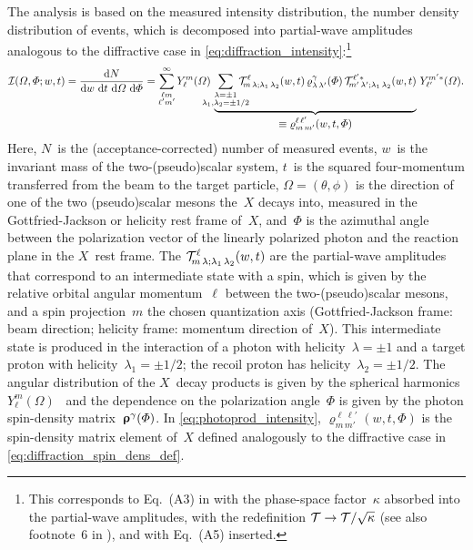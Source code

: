 The analysis is based on the measured intensity distribution, \ie the
number density distribution of events, which is decomposed into
partial-wave amplitudes analogous to the diffractive case in
\cref{eq:diffraction_intensity}:\footnote{\label{fn:photoprod_ampl_redef}This
corresponds to Eq.~(A3) in  with the
phase-space factor~$\kappa$ absorbed into the partial-wave amplitudes,
\ie with the redefinition $\mathcal{T} \to \mathcal{T} / \sqrt{\kappa}$ (see
also footnote~6 in ), and with Eq.~(A5)
inserted.}
\begin{equation}
  \label{eq:photoprod_intensity}
  \intensity(\Omega, \Phi; w, t)
  = \frac{\dif{N}}{\dif{w}\, \dif{t}\, \dif{\Omega}\, \dif{\Phi}}
  = \sum_{\substack{\ell m \\ \ell' m'}}^\infty
  Y_\ell^m(\Omega)~
  \dUnderbrace{\sum_{\substack{\lambda = \pm 1 \\ \mathclap{\lambda_1, \lambda_2 = \pm 1/2}}}
  \prodAmp^\ell_{\!m\, \lambda; \lambda_1\, \lambda_2}(w, t)\,
  \varrho^\gamma_{\lambda\, \lambda'}(\Phi)\,
  \prodAmp^{\ell' *}_{\!m'\, \lambda'; \lambda_1\, \lambda_2}(w, t)}{\equiv \varrho^{\ell\, \ell'}_{m\, m'}(w, t, \Phi)}~
  Y_{\ell'}^{m' *}(\Omega).
\end{equation}
Here, $N$~is the (acceptance-corrected) number of measured events,
$w$~is the invariant mass of the two-(pseudo)scalar system, $t$~is the
squared four-momentum transferred from the beam to the target
particle, $\Omega = (\theta, \phi)$ is the direction of one of the two
(pseudo)scalar mesons the~$X$ decays into, measured in the
Gottfried-Jackson or helicity rest frame of~$X$, and~$\Phi$ is the
azimuthal angle between the polarization vector of the linearly
polarized photon and the reaction plane in the $X$~rest frame.  The
$\mathcal{T}^\ell_{\!m\, \lambda; \lambda_1\, \lambda_2}(w, t)$ are
the partial-wave amplitudes that correspond to an intermediate state
with a spin, which is given by the relative orbital angular
momentum~$\ell$ between the two-(pseudo)scalar mesons, and a spin
projection~$m$ \wrt the chosen quantization axis (Gottfried-Jackson
frame: beam direction; helicity frame: momentum direction of~$X$).
This intermediate state is produced in the interaction of a photon
with helicity~$\lambda = \pm 1$ and a target proton with
helicity~$\lambda_1 = \pm 1/2$; the recoil proton has
helicity~$\lambda_2 = \pm 1/2$.  The angular distribution of the
$X$~decay products is given by the spherical harmonics
$Y_\ell^m(\Omega)$~\cite{wikipedia:sphericalHarm} and the dependence
on the polarization angle~$\Phi$ is given by the photon spin-density
matrix~$\bm{\mathrm{\upvarrho}}^\gamma(\Phi)$.  In
\cref{eq:photoprod_intensity}, $\varrho^{\ell\, \ell'}_{m\, m'}(w, t,
\Phi)$ is the spin-density matrix element of~$X$ defined analogously
to the diffractive case in \cref{eq:diffraction_spin_dens_def}.

